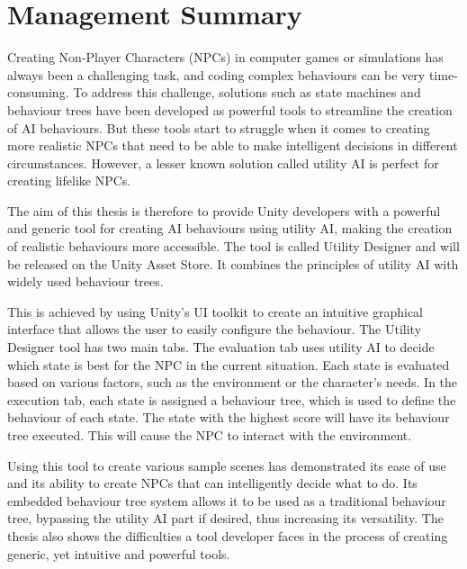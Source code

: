 \chapter*{Management Summary}
\label{chap:managementSummary}

Creating Non-Player Characters (NPCs) in computer games or simulations has always been a challenging task, and coding complex behaviours can be very time-consuming. To address this challenge, solutions such as state machines and behaviour trees have been developed as powerful tools to streamline the creation of AI behaviours. But these tools start to struggle when it comes to creating more realistic NPCs that need to be able to make intelligent decisions in different circumstances. However, a lesser known solution called utility AI is perfect for creating lifelike NPCs.

The aim of this thesis is therefore to provide Unity developers with a powerful and generic tool for creating AI behaviours using utility AI, making the creation of realistic behaviours more accessible. The tool is called Utility Designer and will be released on the Unity Asset Store. It combines the principles of utility AI with widely used behaviour trees.

This is achieved by using Unity's UI toolkit to create an intuitive graphical interface that allows the user to easily configure the behaviour. The Utility Designer tool has two main tabs. The evaluation tab uses utility AI to decide which state is best for the NPC in the current situation. Each state is evaluated based on various factors, such as the environment or the character's needs. In the execution tab, each state is assigned a behaviour tree, which is used to define the behaviour of each state. The state with the highest score will have its behaviour tree executed. This will cause the NPC to interact with the environment.

Using this tool to create various sample scenes has demonstrated its ease of use and its ability to create NPCs that can intelligently decide what to do. Its embedded behaviour tree system allows it to be used as a traditional behaviour tree, bypassing the utility AI part if desired, thus increasing its versatility. The thesis also shows the difficulties a tool developer faces in the process of creating generic, yet intuitive and powerful tools.